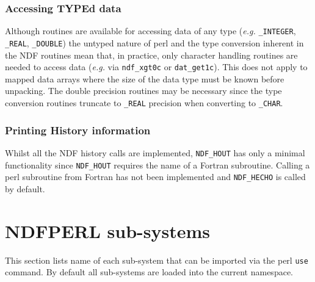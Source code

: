 \documentclass[twoside,11pt]{article}
\newcommand{\xlabel}[1]{}
\begin{document}
\subsubsection{Accessing TYPEd data}%

Although routines are available for accessing data of any type
(\emph{e.g.} \texttt{\_INTEGER}, \texttt{\_REAL}, \texttt{\_DOUBLE})
the untyped nature of perl and the type conversion inherent in the NDF
routines mean that, in practice, only character handling routines are
needed to access data (\emph{e.g.} via \texttt{ndf\_xgt0c} or
\texttt{dat\_get1c}).  This does not apply to mapped data arrays where
the size of the data type must be known before unpacking.  The double
precision routines may be necessary since the type conversion routines
truncate to \texttt{\_REAL} precision when converting to \texttt{\_CHAR}.

\subsubsection{Printing History information}%

Whilst all the NDF history calls are implemented, \texttt{NDF\_HOUT} has
only a minimal functionality since \texttt{NDF\_HOUT} requires the name of a
Fortran subroutine.  Calling a perl subroutine from Fortran has not been
implemented and \texttt{NDF\_HECHO} is called by default.

\appendix
\newpage
\section{\xlabel{ndfperl_sub-systems}NDFPERL sub-systems\label{subsys}}

This section lists name of each sub-system that can be imported via the
perl \texttt{use} command. By default all sub-systems are loaded into the
current namespace.
\end{document}
